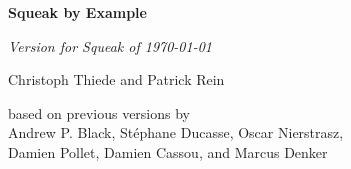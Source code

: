 \begin{titlepage}
   \begin{center}
		\vspace*{1cm}

		\huge\textbf{Squeak by Example}

		\vspace{0.5cm}

		\normalsize\emph{Version{\ifdefined\SQUEAKVERSION
			\space{}for Squeak \SQUEAKVERSION%
			\else\fi\space{}of \today}}%

      	\vspace{0.5cm}

		\large Christoph Thiede and Patrick Rein

		\vspace{0.5cm}

		based on previous versions by \\
		Andrew P. Black, St\'ephane Ducasse, Oscar Nierstrasz, \\
		Damien Pollet, Damien Cassou, and Marcus Denker

   \end{center}
\end{titlepage}

